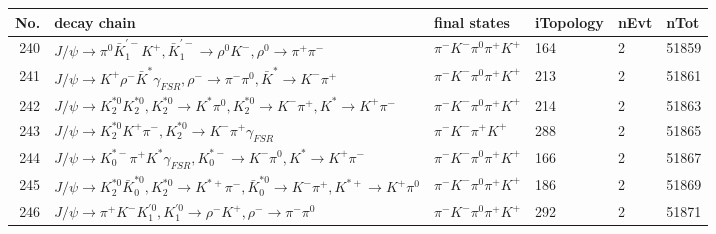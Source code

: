 \begin{table}[htbp] 
\begin{center}
\begin{small}
\begin{tabular}{rlllll}\hline\hline
 No. & decay chain & final states &  iTopology & nEvt & nTot \\\hline
240&$J/\psi       \rightarrow \pi^{0}        \bar{K}_1^{'-}K^{+}          , \bar{K}_1^{'-} \rightarrow \rho^{0}      K^{-}          , \rho^{0}       \rightarrow \pi^{+}        \pi^{-}        $&$\pi^{-}        K^{-}          \pi^{0}        \pi^{+}        K^{+}          $&  164&    2&51859\\
241&$J/\psi       \rightarrow K^{+}          \rho^{-}      \bar{K}^{*}   \gamma_{FSR} , \rho^{-}       \rightarrow \pi^{-}        \pi^{0}        , \bar{K}^{*}    \rightarrow K^{-}          \pi^{+}        $&$\pi^{-}        K^{-}          \pi^{0}        \pi^{+}        K^{+}          $&  213&    2&51861\\
242&$J/\psi       \rightarrow K_2^{*0}       K_2^{*0}       , K_2^{*0}        \rightarrow K^{*}          \pi^{0}        , K_2^{*0}        \rightarrow K^{-}          \pi^{+}        , K^{*}           \rightarrow K^{+}          \pi^{-}        $&$\pi^{-}        K^{-}          \pi^{0}        \pi^{+}        K^{+}          $&  214&    2&51863\\
243&$J/\psi       \rightarrow K_2^{*0}       K^{+}          \pi^{-}        , K_2^{*0}        \rightarrow K^{-}          \pi^{+}        \gamma_{FSR} $&$\pi^{-}        K^{-}          \pi^{+}        K^{+}          $&  288&    2&51865\\
244&$J/\psi       \rightarrow K_{0}^{*-}     \pi^{+}        K^{*}          \gamma_{FSR} , K_{0}^{*-}      \rightarrow K^{-}          \pi^{0}        , K^{*}           \rightarrow K^{+}          \pi^{-}        $&$\pi^{-}        K^{-}          \pi^{0}        \pi^{+}        K^{+}          $&  166&    2&51867\\
245&$J/\psi       \rightarrow K_2^{*0}       \bar{K}_0^{*0}, K_2^{*0}        \rightarrow K^{*+}         \pi^{-}        , \bar{K}_0^{*0} \rightarrow K^{-}          \pi^{+}        , K^{*+}          \rightarrow K^{+}          \pi^{0}        $&$\pi^{-}        K^{-}          \pi^{0}        \pi^{+}        K^{+}          $&  186&    2&51869\\
246&$J/\psi       \rightarrow \pi^{+}        K^{-}          K_1^{'0}      , K_1^{'0}       \rightarrow \rho^{-}      K^{+}          , \rho^{-}       \rightarrow \pi^{-}        \pi^{0}        $&$\pi^{-}        K^{-}          \pi^{0}        \pi^{+}        K^{+}          $&  292&    2&51871\\

\end{tabular}
\end{small}
\end{center}
\end{table}
